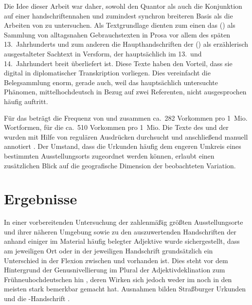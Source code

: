 Die Idee dieser Arbeit war daher, sowohl den Quantor als auch die Konjunktion
 auf einer handschriftennahen und zumindest synchron breiteren
Basis als die Arbeiten von \citet{askedal1973,askedal1974} zu untersuchen. Als
Textgrundlage dienten zum einen das  (\CAO{}) als
Sammlung von alltagsnahen Gebrauchstexten in Prosa vor allem des späten
13.~Jahrhunderts und zum anderen die Haupthandschriften der \KC{}
(\KC{}) als erzählerisch ausgestalteter Sachtext in Versform, der
hauptsächlich im 13.\ und 14.\ Jahrhundert breit über\-liefert ist. Diese Texte
haben den Vorteil, dass sie digital in diplomatischer Transkription vorliegen.
Dies vereinfacht die Belegsammlung enorm, gerade auch, weil das hauptsächlich
untersuchte Phänomen, mittelhochdeutsch   in Bezug auf
zwei Referenten, nicht ausgesprochen häufig auftritt.

Für das \CAO{} beträgt die Frequenz von  und 
zusammen ca.~282 Vorkommen pro 1~Mio. Wortformen, für die \KC{} ca.~510
Vorkommen pro 1~Mio. Die Texte des \CAO{} und der \KC{} wurden
mit Hilfe von regulären Ausdrücken durchsucht und anschließend manuell
annotiert \autocites[vgl.\ z.\,B.][33--37]{perkuhnetal2012}[zur Methode
vgl.][207--209]{beckerschallert2021}[155--158]{beckerschallert2022b}. Der
Umstand, dass die Urkunden häufig dem engeren Umkreis eines bestimmten
Ausstellungs\-orts zugeordnet werden können, erlaubt einen zusätzlichen Blick
auf die geografische Dimension der beobachteten Variation.

\section{Ergebnisse}

In einer vorbereitenden Untersuchung der zahlenmäßig größten Ausstellungsorte
und ihrer näheren Umgebung sowie zu den auszuwertenden Handschriften der
\KC{} anhand einiger im Material häufig belegter Adjektive wurde
sichergestellt, dass am jeweiligen Ort oder in der jeweiligen Handschrift
grundsätzlich ein Unterschied in der Flexion zwischen  und
 vorhanden ist. Dies steht vor dem Hintergrund der Genusnivellierung
im Plural der Adjektivdeklination zum Frühneuhochdeutschen hin
\autocite[191--192]{reichmannwegera1993}, deren Wirken sich jedoch weder im
\CAO{} noch in den meisten \KC{} stark bemerkbar gemacht hat.
Ausnahmen bilden Straßburger Urkunden und die \KC{}-Handschrift
\citet{kc:Z}.

